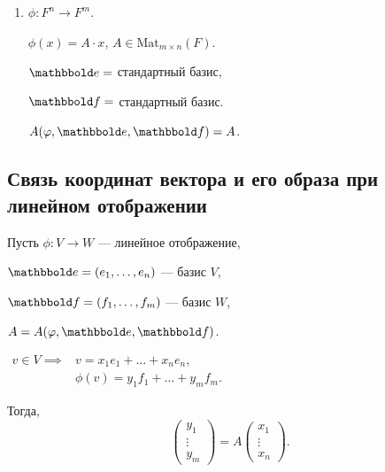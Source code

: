 \begin{enumerate}[start=0]
\item $\phi\colon F^n \to F^m$.

    $\phi(x) = A \cdot x$, $A \in \text{Mat}_{m \times n}(F)$.

    $\E = $ стандартный базис,

    $\F = $ стандартный базис.

    $A(\phi, \E, \F) = A$.
\end{enumerate}


\subsection{Связь координат вектора и его образа при линейном отображении}

\begin{proposal}
    Пусть $\phi \colon V \to W$ --- линейное отображение,

    $\E = (e_1, \dots, e_n)$ --- базис $V$,

    $\F = (f_1, \dots, f_m)$ --- базис $W$,

    $A = A(\phi, \E, \F)$.

    \begin{math}
        \begin{aligned}
            v \in V \implies &v = x_1 e_1 + \dots + x_n e_n, \\
            &\phi(v) = y_1 f_1 + \dots + y_m f_m.
        \end{aligned}
    \end{math}

    Тогда,
    \begin{equation*}
        \begin{pmatrix} y_1 \\ \vdots \\ y_m \end{pmatrix} = A \begin{pmatrix} x_1 \\ \vdots \\ x_n \end{pmatrix}
    .\end{equation*}
\end{proposal}

